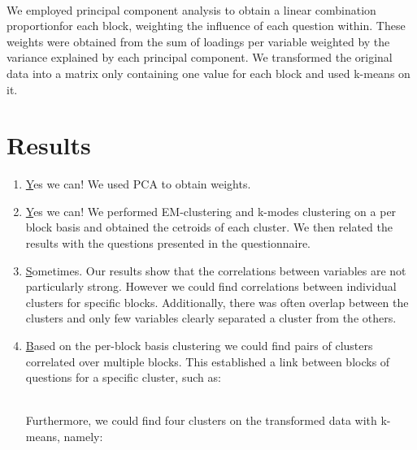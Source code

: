 \documentclass{article}
\begin{document}
\paragraph{}
We employed principal component analysis to obtain a linear combination proportionfor each block, weighting the influence of each question within.
These weights were obtained from the sum of loadings per variable weighted by the variance explained by each principal component.
We transformed the original data into a matrix only containing one value for each block and used k-means on it.

\section{Results}

\begin{enumerate}
  \item \href{qs:aggregation} Yes we can! We used PCA to obtain weights.

  \item \href{qs:blockCluster} Yes we can! We performed EM-clustering and k-modes clustering on a per block basis and obtained the cetroids of each cluster. We then related the results with the questions presented in the questionnaire.

  \item \href{qs:blockCorrelations} Sometimes. Our results show that the correlations between variables are not particularly strong. However we could find correlations between individual clusters for specific blocks. Additionally, there was often overlap between the clusters and only few variables clearly separated a cluster from the others.

  \item \href{qs:types} Based on the per-block basis clustering we could find pairs of clusters correlated over multiple blocks. This established a link between blocks of questions for a specific cluster, such as:
    \\
    Furthermore, we could find four clusters on the transformed data with k-means, namely:


\end{enumerate}
\end{document}
